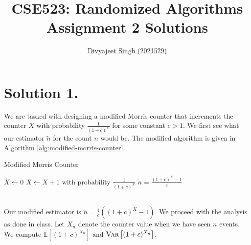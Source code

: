 \documentclass[9pt]{article}
\title{
    \textbf{CSE523: Randomized Algorithms} \\
    \textbf{\large{Assignment 2 Solutions}} %
}
\author{
    \href{mailto:divyajeet21529@iiitd.ac.in}{Divyajeet Singh (2021529)}
}
\date{}
\newcommand{\Expectation}[1]{\mathbb{E}\left[ #1 \right]}
\newcommand{\Variance}[1]{\textsc{Var}\left[ #1 \right]}
\begin{document}
\maketitle

\section*{\textbf{Solution 1.}}
We are tasked with designing a modified Morris counter that increments the counter
$X$ with probability $\frac{1}{(1 + c)^{X}}$ for some constant $c > 1$. We first
see what our estimator $\tilde{n}$ for the count $n$ would be. The modified algorithm
is given in Algorithm \ref{alg:modified-morris-counter}.
\begin{algorithm}
    \caption{Modified Morris Counter}
    \label{alg:modified-morris-counter}
    \begin{algorithmic}[1]
        \State $X \gets 0$
            \State $X \gets X + 1$ with probability $\frac{1}{(1 + c)^{X}}$
        \EndWhile
        \State \Return $\tilde{n} = \frac{(1 + c)^{X} - 1}{c}$
    \end{algorithmic}
\end{algorithm}
\vspace*{0pt} \\
Our modified estimator is $\tilde{n} = \frac{1}{c}((1 + c)^{X} - 1)$. We proceed with the analysis
as done in class. Let $X_{n}$ denote the counter value when we have seen $n$ events.
We compute $\Expectation{(1 + c)^{X_{n}}}$ and $\Variance{(1 + c)^{X_{n}}}$.
\end{document}
